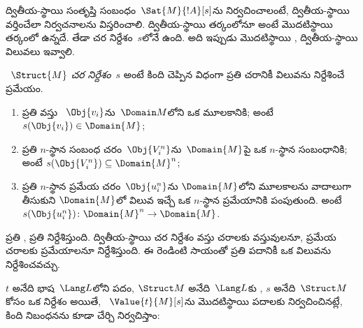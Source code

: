 \documentclass[../../../include/open-logic-section]{subfiles}
\begin{document}


\begin{explain}
ద్వితీయ-స్థాయి  సంతృప్తి సంబంధం~$\Sat{M}{!A}[s]$ను
నిర్వచించాలంటే, ద్వితీయ-స్థాయి  వర్తించేలా నిర్వచనాలను
విస్తరించాలి. ద్వితీయ-స్థాయి తర్కంలోనూ  అంటే మొదటిస్థాయి
తర్కంలో ఉన్నదే. తేడా చర నిర్దేశం~$s$లోనే ఉంది. అది ఇప్పుడు మొదటిస్థాయి
, ద్వితీయ-స్థాయి  విలువలు ఇవ్వాలి.
\end{explain}

\begin{defn}[చర నిర్దేశం]
~$\Struct{M}$ \emph{చర నిర్దేశం}~$s$ అంటే కింది
చెప్పిన విధంగా ప్రతి చరానికీ విలువను నిర్దేశించే ప్రమేయం.
\begin{enumerate}
\item ప్రతి వస్తు ~$\Obj{v_i}$ను~$\Domain M$లోని ఒక మూలకానికి;
  అంటే $s(\Obj{v_i}) \in \Domain{M}$;
\item ప్రతి $n$-స్థాన సంబంధ చరం~$\Obj{V_i^n}$ను~$\Domain{M}$పై ఒక
  $n$-స్థాన సంబంధానికి; అంటే $s(\Obj{V_i^n}) \subseteq \Domain{M}^n$;
\item ప్రతి $n$-స్థాన ప్రమేయ చరం~$\Obj{u_i^n}$ను $\Domain{M}$లోని మూలకాలను వాదాలుగా తీసుకుని
  $\Domain{M}$లో విలువ ఇచ్చే ఒక $n$-స్థాన ప్రమేయానికి పంపుతుంది. అంటే
  $s(\Obj{u_i^n})\colon \Domain{M}^n \to \Domain{M}$.
\end{enumerate}
\end{defn}

\begin{explain}
 ప్రతి ,
ప్రతి   నిర్దేశిస్తుంది.
ద్వితీయ-స్థాయి చర నిర్దేశం వస్తు చరాలకు వస్తువులనూ, ప్రమేయ చరాలకు
ప్రమేయాలనూ నిర్దేశిస్తుంది. ఈ రెండింటి సాయంతో ప్రతి పదానికీ ఒక
విలువను నిర్దేశించవచ్చు.
\end{explain}

\begin{defn}
$t$ అనేది భాష~$\Lang L$లోని పదం, $\Struct M$ అనేది~$\Lang L$కు
, $s$ అనేది~$\Struct M$ కోసం ఒక  నిర్దేశం
అయితే, \emph{}~$\Value{t}{M}[s]$ను మొదటిస్థాయి పదాలకు
నిర్వచించినట్లే, కింది నిబంధనను కూడా చేర్చి నిర్వచిస్తాం:
\begin{quote}
\end{quote}
\end{defn}
\end{document}
